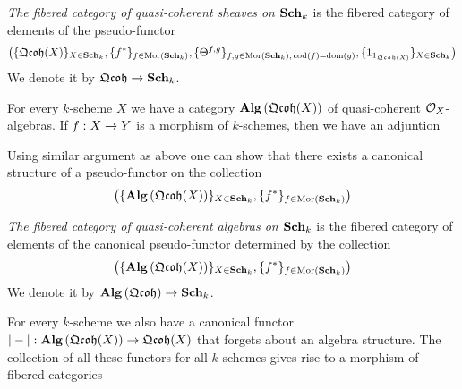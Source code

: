\begin{definition}
\textit{The fibered category of quasi-coherent sheaves on $\mathbf{Sch}_k$} is the fibered category of elements of the pseudo-functor
$$\big(\{\mathfrak{Qcoh}(X)\}_{X\in \mathbf{Sch}_k},\{f^*\}_{f\in \mathrm{Mor}(\mathbf{Sch}_k)},\{\Theta^{f,g}\}_{f,g\in \mathrm{Mor}(\mathbf{Sch}_k),\,\mathrm{cod}(f)=\mathrm{dom}(g)},\{1_{1_{\mathfrak{Qcoh}(X)}}\}_{X\in \mathbf{Sch}_k}\big)$$
We denote it by $\mathfrak{Qcoh} \rightarrow \mathbf{Sch}_k$.
\end{definition}
\noindent
For every $k$-scheme $X$ we have a category $\mathbf{Alg}\left(\mathfrak{Qcoh}(X)\right)$ of quasi-coherent ${\mathcal O}_X$-algebras. If $f:X\rightarrow Y$ is a morphism of $k$-schemes, then we have an adjuntion
\begin{center}   
\end{center}
Using similar argument as above one can show that there exists a canonical structure of a pseudo-functor on the collection
$$\big(\{\mathbf{Alg}\left(\mathfrak{Qcoh}(X)\right)\}_{X\in \mathbf{Sch}_k},\{f^*\}_{f\in \mathrm{Mor}(\mathbf{Sch}_k)}\big)$$

\begin{definition}
\textit{The fibered category of quasi-coherent algebras on $\mathbf{Sch}_k$} is the fibered category of elements of the canonical pseudo-functor determined by the collection
$$\big(\{\mathbf{Alg}\left(\mathfrak{Qcoh}(X)\right)\}_{X\in \mathbf{Sch}_k},\{f^*\}_{f\in \mathrm{Mor}(\mathbf{Sch}_k)}\big)$$
We denote it by $\mathbf{Alg}\left(\mathfrak{Qcoh}\right)\rightarrow \mathbf{Sch}_k$.
\end{definition}

\begin{remark}\label{remark:from_qc_algebras_to_qc_sheaves_over_schemes}
For every $k$-scheme we also have a canonical functor $|-|:\mathbf{Alg}\left(\mathfrak{Qcoh}(X)\right)\rightarrow \mathfrak{Qcoh}(X)$ that forgets about an algebra structure. The collection of all these functors for all $k$-schemes gives rise to a morphism of fibered categories
\begin{center}
\end{center}
\end{remark}

